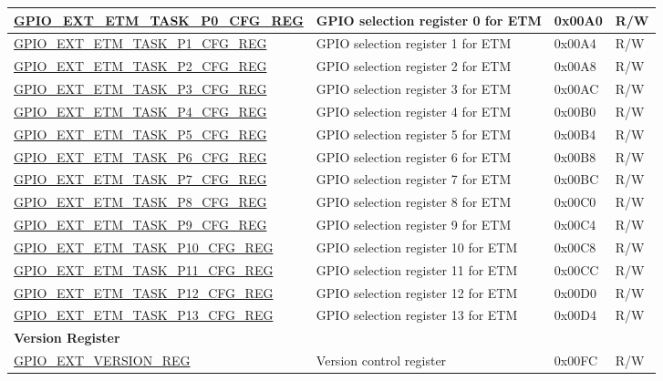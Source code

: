 \begin{longtable}{ | p{6.2cm} | p{7cm} | p{1.3cm} | p{1cm} | }
\hyperref[regdesc:GPIOSDETMTASKP0CFGREG]{GPIO\_EXT\_ETM\_TASK\_P0\_CFG\_REG} & GPIO selection register 0 for ETM & 0x00A0 & R/W \\ \hline
\hyperref[regdesc:GPIOSDETMTASKP1CFGREG]{GPIO\_EXT\_ETM\_TASK\_P1\_CFG\_REG} & GPIO selection register 1 for ETM & 0x00A4 & R/W \\ \hline
\hyperref[regdesc:GPIOSDETMTASKP2CFGREG]{GPIO\_EXT\_ETM\_TASK\_P2\_CFG\_REG} & GPIO selection register 2 for ETM & 0x00A8 & R/W \\ \hline
\hyperref[regdesc:GPIOSDETMTASKP3CFGREG]{GPIO\_EXT\_ETM\_TASK\_P3\_CFG\_REG} & GPIO selection register 3 for ETM & 0x00AC & R/W \\ \hline
\hyperref[regdesc:GPIOSDETMTASKP4CFGREG]{GPIO\_EXT\_ETM\_TASK\_P4\_CFG\_REG} & GPIO selection register 4 for ETM & 0x00B0 & R/W \\ \hline
\hyperref[regdesc:GPIOSDETMTASKP5CFGREG]{GPIO\_EXT\_ETM\_TASK\_P5\_CFG\_REG} & GPIO selection register 5 for ETM & 0x00B4 & R/W \\ \hline
\hyperref[regdesc:GPIOSDETMTASKP6CFGREG]{GPIO\_EXT\_ETM\_TASK\_P6\_CFG\_REG} & GPIO selection register 6 for ETM & 0x00B8 & R/W \\ \hline
\hyperref[regdesc:GPIOSDETMTASKP7CFGREG]{GPIO\_EXT\_ETM\_TASK\_P7\_CFG\_REG} & GPIO selection register 7 for ETM & 0x00BC & R/W \\ \hline
\hyperref[regdesc:GPIOSDETMTASKP8CFGREG]{GPIO\_EXT\_ETM\_TASK\_P8\_CFG\_REG} & GPIO selection register 8 for ETM & 0x00C0 & R/W \\ \hline
\hyperref[regdesc:GPIOSDETMTASKP9CFGREG]{GPIO\_EXT\_ETM\_TASK\_P9\_CFG\_REG} & GPIO selection register 9 for ETM & 0x00C4 & R/W \\ \hline
\hyperref[regdesc:GPIOSDETMTASKP10CFGREG]{GPIO\_EXT\_ETM\_TASK\_P10\_CFG\_REG} & GPIO selection register 10 for ETM & 0x00C8 & R/W \\ \hline
\hyperref[regdesc:GPIOSDETMTASKP11CFGREG]{GPIO\_EXT\_ETM\_TASK\_P11\_CFG\_REG} & GPIO selection register 11 for ETM & 0x00CC & R/W \\ \hline
\hyperref[regdesc:GPIOSDETMTASKP12CFGREG]{GPIO\_EXT\_ETM\_TASK\_P12\_CFG\_REG} & GPIO selection register 12 for ETM & 0x00D0 & R/W \\ \hline
\hyperref[regdesc:GPIOSDETMTASKP13CFGREG]{GPIO\_EXT\_ETM\_TASK\_P13\_CFG\_REG} & GPIO selection register 13 for ETM & 0x00D4 & R/W \\ \hline
\multicolumn{4}{|l|}{\textbf{Version Register}} \\ \hline
\hyperref[regdesc:GPIOSDVERSIONREG]{GPIO\_EXT\_VERSION\_REG} & Version control register & 0x00FC & R/W \\ \hline
\end{longtable}
